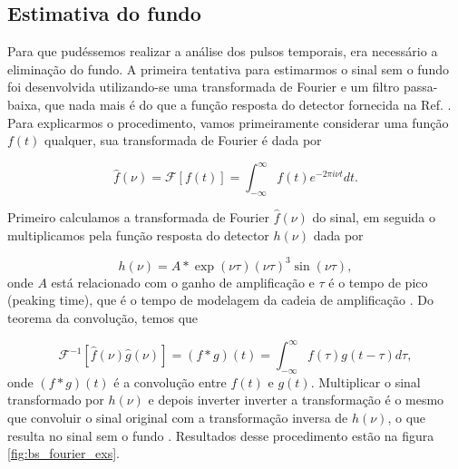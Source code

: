 \documentclass[a4paper,12pt,oneside]{book}
\begin{document}

\subsection{Estimativa do fundo}\label{subsec:pulses_baseline}

\par Para que pudéssemos realizar a análise dos pulsos temporais, era necessário a eliminação do fundo. A primeira tentativa para estimarmos o sinal sem o fundo foi desenvolvida utilizando-se uma transformada de Fourier e um filtro passa-baixa, que nada mais é do que a função resposta do detector fornecida na Ref. \cite{GET}. Para explicarmos o procedimento, vamos primeiramente considerar uma função $f(t)$ qualquer, sua transformada de Fourier é dada por

\begin{equation} \label{eq:fourier}
    \hat{f}(\nu)=\mathscr{F}[f(t)]=\int_{-\infty}^{\infty} f(t) e^{-2 \pi i \nu t} d t.
\end{equation}

\par Primeiro calculamos a transformada de Fourier $\hat{f}(\nu)$ do sinal, em seguida o multiplicamos pela função resposta do detector $h(\nu)$ dada por \cite{GET}

\begin{equation}
    h(\nu) = A*\exp\left (\nu \tau \right)\left(\nu \tau\right)^3 \sin \left( \nu \tau \right) ,
\end{equation}
%
onde $A$ está relacionado com o ganho de amplificação e $\tau$ é o tempo de pico (peaking time), que é o tempo de modelagem da cadeia de amplificação \cite{GET}. Do teorema da convolução, temos que \cite{metodos_mat_aplicada}


\begin{equation}
    \mathscr{F}^{-1}[\hat{f}(\nu) \hat{g}(\nu)]=(f * g)(t)=\int_{-\infty}^{\infty} f(\tau) g(t-\tau) d \tau, 
\end{equation}
%
onde $(f * g)(t)$ é a convolução entre $f(t)$ e $g(t)$. Multiplicar o sinal transformado por $h(\nu)$ e depois inverter inverter a transformação é o mesmo que convoluir o sinal original com a transformação inversa de $h(\nu)$, o que resulta no sinal sem o fundo \cite{josh_bradt, GET}. Resultados desse procedimento estão na figura \ref{fig:bs_fourier_exs}.
\end{document}
